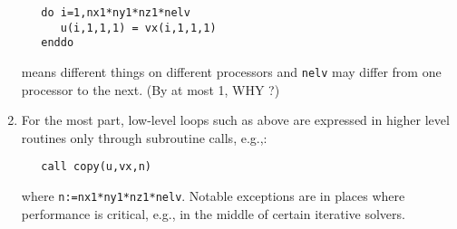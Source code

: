 \begin{enumerate}
\begin{verbatim}
   do i=1,nx1*ny1*nz1*nelv
      u(i,1,1,1) = vx(i,1,1,1)
   enddo
\end{verbatim}

   means different things on different processors and {\tt nelv} may
   differ from one processor to the next.  (By at most 1, WHY ?)


\item For the most part, low-level loops such as above are expressed in
   higher level routines only through subroutine calls, e.g.,:

\begin{verbatim}
   call copy(u,vx,n)
\end{verbatim}

   where {\tt n:=nx1*ny1*nz1*nelv}.   Notable exceptions are in places where
   performance is critical, e.g., in the middle of certain iterative
   solvers.

\end{enumerate}

